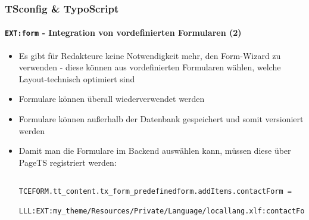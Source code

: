 \begin{frame}[fragile]
	\frametitle{TSconfig \& TypoScript}
	\framesubtitle{\texttt{EXT:form} - Integration von vordefinierten Formularen (2)}

	\lstset{basicstyle=\tiny\ttfamily}

	\begin{itemize}

		\item Es gibt für Redakteure keine Notwendigkeit mehr, den Form-Wizard zu verwenden - diese können aus vordefinierten Formularen wählen, welche Layout-technisch optimiert sind

		\item Formulare können überall wiederverwendet werden

		\item Formulare können außerhalb der Datenbank gespeichert und somit versioniert werden

		\item Damit man die Formulare im Backend auswählen kann, müssen diese über PageTS registriert werden:

		\begin{lstlisting}
			TCEFORM.tt_content.tx_form_predefinedform.addItems.contactForm =
			  LLL:EXT:my_theme/Resources/Private/Language/locallang.xlf:contactForm
		\end{lstlisting}

	\end{itemize}

\end{frame}

